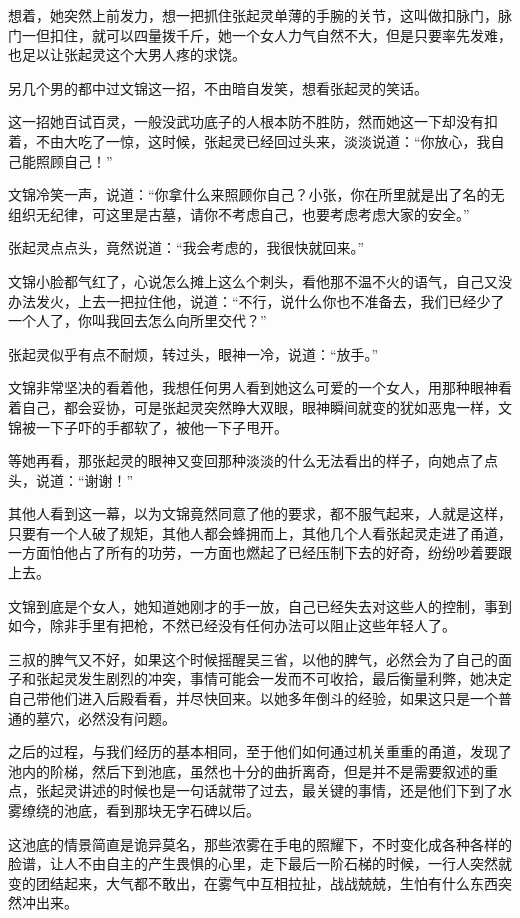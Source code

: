 想着，她突然上前发力，想一把抓住张起灵单薄的手腕的关节，这叫做扣脉门，脉门一但扣住，就可以四量拨千斤，她一个女人力气自然不大，但是只要率先发难，也足以让张起灵这个大男人疼的求饶。

另几个男的都中过文锦这一招，不由暗自发笑，想看张起灵的笑话。

这一招她百试百灵，一般没武功底子的人根本防不胜防，然而她这一下却没有扣着，不由大吃了一惊，这时候，张起灵已经回过头来，淡淡说道：“你放心，我自己能照顾自己！”

文锦冷笑一声，说道：“你拿什么来照顾你自己？小张，你在所里就是出了名的无组织无纪律，可这里是古墓，请你不考虑自己，也要考虑考虑大家的安全。”

张起灵点点头，竟然说道：“我会考虑的，我很快就回来。”

文锦小脸都气红了，心说怎么摊上这么个刺头，看他那不温不火的语气，自己又没办法发火，上去一把拉住他，说道：“不行，说什么你也不准备去，我们已经少了一个人了，你叫我回去怎么向所里交代？”

张起灵似乎有点不耐烦，转过头，眼神一冷，说道：“放手。”

文锦非常坚决的看着他，我想任何男人看到她这么可爱的一个女人，用那种眼神看着自己，都会妥协，可是张起灵突然睁大双眼，眼神瞬间就变的犹如恶鬼一样，文锦被一下子吓的手都软了，被他一下子甩开。

等她再看，那张起灵的眼神又变回那种淡淡的什么无法看出的样子，向她点了点头，说道：“谢谢！”

其他人看到这一幕，以为文锦竟然同意了他的要求，都不服气起来，人就是这样，只要有一个人破了规矩，其他人都会蜂拥而上，其他几个人看张起灵走进了甬道，一方面怕他占了所有的功劳，一方面也燃起了已经压制下去的好奇，纷纷吵着要跟上去。

文锦到底是个女人，她知道她刚才的手一放，自己已经失去对这些人的控制，事到如今，除非手里有把枪，不然已经没有任何办法可以阻止这些年轻人了。

三叔的脾气又不好，如果这个时候摇醒吴三省，以他的脾气，必然会为了自己的面子和张起灵发生剧烈的冲突，事情可能会一发而不可收拾，最后衡量利弊，她决定自己带他们进入后殿看看，并尽快回来。以她多年倒斗的经验，如果这只是一个普通的墓穴，必然没有问题。

之后的过程，与我们经历的基本相同，至于他们如何通过机关重重的甬道，发现了池内的阶梯，然后下到池底，虽然也十分的曲折离奇，但是并不是需要叙述的重点，张起灵讲述的时候也是一句话就带了过去，最关键的事情，还是他们下到了水雾缭绕的池底，看到那块无字石碑以后。

这池底的情景简直是诡异莫名，那些浓雾在手电的照耀下，不时变化成各种各样的脸谱，让人不由自主的产生畏惧的心里，走下最后一阶石梯的时候，一行人突然就变的团结起来，大气都不敢出，在雾气中互相拉扯，战战兢兢，生怕有什么东西突然冲出来。

